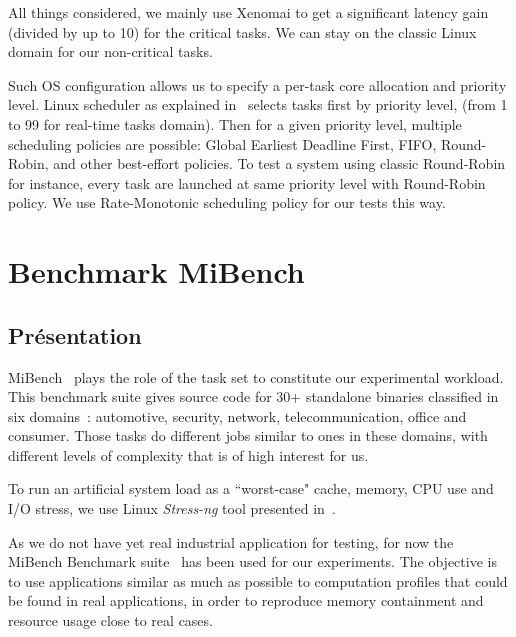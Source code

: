 \documentclass[french, a4paper, 11pt, twoside, pdftex]{StyleThese}
\begin{document}
                        All things considered, we mainly use Xenomai to get a significant latency gain (divided by up to 10) for the critical tasks. We can stay on the classic Linux domain for our non-critical tasks.
            
                    Such OS configuration allows us to specify a per-task core allocation and priority level. Linux scheduler as explained in~\cite{ishkov_complete_2015} selects tasks first by priority level, (from 1 to 99 for real-time tasks domain). Then for a given priority level, multiple scheduling policies are possible: Global Earliest Deadline First, FIFO, Round-Robin, and other best-effort policies. To test a system using classic Round-Robin for instance, every task are launched at same priority level with Round-Robin policy. We use Rate-Monotonic scheduling policy for our tests this way.
                        
    \section{Benchmark MiBench}
        \subsection{Présentation}
        MiBench~\cite{guthaus_mibench_2001} plays the role of the task set to constitute our experimental workload. This benchmark suite gives source code for 30+ standalone binaries classified in six domains~: automotive, security, network, telecommunication, office and consumer. Those tasks do different jobs similar to ones in these domains, with different levels of complexity that is of high interest for us.

            To run an artificial system load as a ``worst-case" cache, memory, CPU use and I/O stress, we use Linux \textit{Stress-ng} tool presented in~\cite{king_stress-ng_2019}. 


            As we do not have yet real industrial application for testing, for now the MiBench Benchmark suite~\cite{guthaus_mibench_2001} has been used for our experiments. The objective is to use applications similar as much as possible to computation profiles that could be found in real applications, in order to reproduce memory containment and resource usage close to real cases. 
            
\end{document}
